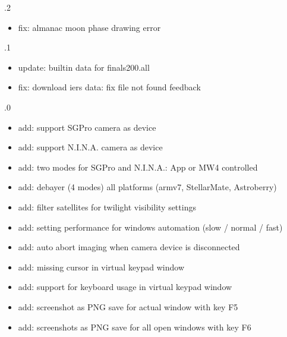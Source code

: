 \documentclass[a4paper,10pt,english]{sphinxmanual}
\begin{document}
.2
\begin{itemize}
\item {} 
\sphinxAtStartPar
fix: almanac moon phase drawing error

\end{itemize}

.1
\begin{itemize}
\item {} 
\sphinxAtStartPar
update: builtin data for finals200.all

\item {} 
\sphinxAtStartPar
fix: download iers data: fix file not found feedback

\end{itemize}

.0
\begin{itemize}
\item {} 
\sphinxAtStartPar
add: support SGPro camera as device

\item {} 
\sphinxAtStartPar
add: support N.I.N.A. camera as device

\item {} 
\sphinxAtStartPar
add: two modes for SGPro and N.I.N.A.: App or MW4 controlled

\item {} 
\sphinxAtStartPar
add: debayer (4 modes) all platforms (armv7, StellarMate, Astroberry)

\item {} 
\sphinxAtStartPar
add: filter satellites for twilight visibility settings

\item {} 
\sphinxAtStartPar
add: setting performance for windows automation (slow / normal / fast)

\item {} 
\sphinxAtStartPar
add: auto abort imaging when camera device is disconnected

\item {} 
\sphinxAtStartPar
add: missing cursor in virtual keypad window

\item {} 
\sphinxAtStartPar
add: support for keyboard usage in virtual keypad window

\item {} 
\sphinxAtStartPar
add: screenshot as PNG save for actual window with key F5

\item {} 
\sphinxAtStartPar
add: screenshots as PNG save for all open windows with key F6


\end{itemize}
\end{document}
